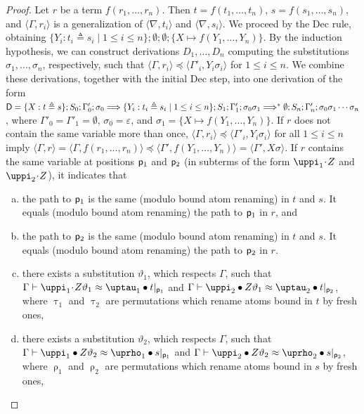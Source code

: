 \documentclass[11pt,a4paper]{amsart}
\theoremstyle{definition}
\newcommand{\Lra}{\Longrightarrow}
\newcommand{\permap}{{\mkern 1mu\cdot \mkern 1mu}}
\newcommand{\permef}{\bullet}
\newcommand\pos{{\sf p}}
\newcommand\ppi{\uppi}
\newcommand\prho{\uprho}
\newcommand\ptau{\uptau}
\newcommand{\np}[2]{\langle #1, \allowbreak #2\rangle}
\begin{document}
\begin{proof}
Let $r$ be a term $f(r_1,\ldots,r_n)$. Then $t=f(t_1,\ldots,t_n)$, $s=f(s_1,\ldots,s_n)$, and $\np{\Gamma}{r_i}$ is a generalization of $\np{\nabla}{t_i}$ and $\np{\nabla}{s_i}$. We proceed by the {\sf Dec} rule, obtaining $\{Y_i : t_i\triangleq s_i \mid 1\le i\le n\};\emptyset;\emptyset;\{X\mapsto f(Y_1,\ldots,Y_n)\}$. By the induction hypothesis, we can construct derivations $D_1,\ldots,D_n$ computing the substitutions $\sigma_1,\ldots,\sigma_n$, respectively, such that $\np{\Gamma}{r_i}\preceq \np{\Gamma'_i}{Y_i\sigma_i}$ for $1\le i \le n$. We combine these derivations, together with the initial \textsf{Dec} step, into one derivation of the form ${\sf D} = \{X:t \triangleq s \};S_0;\Gamma'_0;\sigma_0\Lra \{Y_i:t_i \triangleq s_i \mid 1\le i \le n\};S_1;\Gamma'_1;\sigma_0\sigma_1 \Lra^* \emptyset; S_n; \Gamma'_n; \sigma_0\sigma_1\cdots\sigma_n$, where $\Gamma'_0=\Gamma'_1=\emptyset$, $\sigma_0=\varepsilon$, and $\sigma_1= \{X\mapsto f(Y_1,\ldots,Y_n)\}$. If $r$ does not contain the same variable more than once, $\np{\Gamma}{r_i}\preceq \np{\Gamma'_i}{Y_i\sigma_i}$ for all $1\le i \le n$ imply $\np{\Gamma}{r} = \np{\Gamma}{f(r_1,\ldots,r_n)} \preceq \np{\Gamma'}{f(Y_1,\ldots,Y_n)} = \np{\Gamma'}{X\sigma}$. If $r$ contains the same variable at positions $\pos_1$ and $\pos_2$ (in subterms of the form $\ppi_1\permap Z$ and $\ppi_2\permap Z$), it indicates that
\begin{enumerate}[(a)]
  \item\label{a} the path to $\pos_1$ is the same (modulo bound atom renaming) in $t$ and $s$. It equals (modulo bound atom renaming) the path to $\pos_1$ in $r$, and
  \item\label{b} the path to $\pos_2$ is the same (modulo bound atom renaming) in $t$ and $s$. It equals (modulo bound atom renaming) the path to $\pos_2$ in $r$.
  \item\label{c} there exists a substitution $\vartheta_1$, which respects $\Gamma$, such that $\Gamma \vdash \ppi_1\permap Z\vartheta_1 \approx \ptau_1\permef t|_{\pos_1}$ and $\Gamma \vdash \ppi_2\permef Z\vartheta_1 \approx \ptau_2\permef t|_{\pos_2}$, where $\ptau_1$ and $\ptau_2$ are permutations which rename atoms bound in $t$ by fresh ones,
  \item\label{d} there exists a substitution $\vartheta_2$, which respects $\Gamma$, such that $\Gamma \vdash \ppi_1\permef Z\vartheta_2 \approx \prho_1\permef s|_{\pos_1}$ and $\Gamma \vdash \ppi_2\permef Z\vartheta_2 \approx \prho_2\permef s|_{\pos_2}$, where $\prho_1$ and $\prho_2$ are permutations which rename atoms bound in $s$ by fresh ones,
\end{enumerate}


\end{proof}
\end{document}
